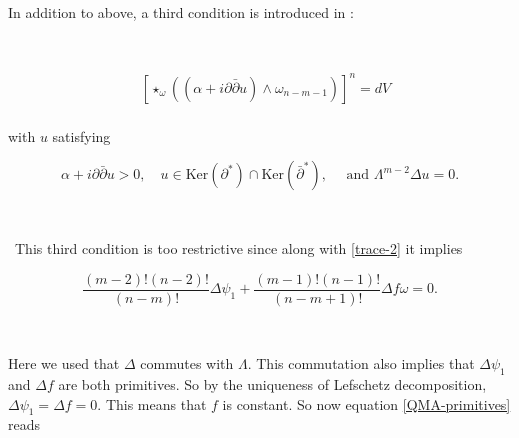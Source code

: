 \documentclass[11pt,letterpaper]{amsart}
\newcommand{\spartial}{\partial^*}
\newcommand{\pbp}{\partial \bar{\partial}}
\newcommand{\Ker}{\mbox{Ker}}
\numberwithin{equation}{section}
\begin{document}




{ }

\bigskip

In addition to above, a third condition is introduced in \cite{DP25}:

\

\begin{equation}\label{MA-eqn2}
\begin{aligned}
    &\left[\star_{\omega}\left((\alpha + i \pbp u)\wedge \omega_{n-m-1}\right)\right]^n = dV\\
\end{aligned}
\end{equation}


\noindent with $u$ satisfying 

\begin{equation}\label{generalIC}
    \alpha + i \pbp u >0, \quad u \in \Ker (\spartial) \cap \Ker( \bar{\partial}^*), \quad \text{ and }\Lambda^{m-2} \Delta u =0.
\end{equation}

\

\ This third condition is too restrictive since along with \eqref{trace-2} it implies


\begin{equation}
    \frac{(m-2)!(n-2)!}{(n-m)!} \Delta \psi_1 + \frac{(m-1)!(n-1)!}{(n-m+1)!} \Delta f \omega = 0.
\end{equation}

\


Here we used that $\Delta$ commutes with $\Lambda$. This commutation also implies that $\Delta \psi_1$ and $\Delta f$ are both primitives. So by the uniqueness of Lefschetz decomposition, $\Delta \psi_1 = \Delta f =0$. This means that $f$ is constant. So now equation \eqref{QMA-primitives} reads
\end{document}

